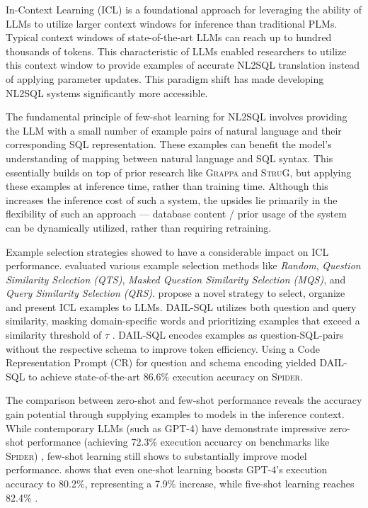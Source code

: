 \documentclass{article}
\begin{document}
In-Context Learning (ICL) is a foundational approach for leveraging the ability of LLMs to utilize larger context windows for
inference than traditional PLMs. Typical context windows of state-of-the-art LLMs can reach up to hundred thousands of tokens.
This characteristic of LLMs enabled researchers to utilize this context window to provide examples of accurate NL2SQL translation
instead of applying parameter updates. This paradigm shift has made developing NL2SQL systems significantly more accessible.

The fundamental principle of few-shot learning for NL2SQL involves providing the LLM with a small number of example pairs
of natural language and their corresponding SQL representation. These examples can benefit the model's understanding of
mapping between natural language and SQL syntax. This essentially builds on top of prior research like \textsc{Grappa}
and \textsc{StruG}, but applying these examples at inference time, rather than training time. Although this increases
the inference cost of such a system, the upsides lie primarily in the flexibility of such an approach — database content
/ prior usage of the system can be dynamically utilized, rather than requiring retraining.

Example selection strategies showed to have a considerable impact on ICL performance. \cite{DAIL-SQL} evaluated
various example selection methods like \textit{Random}, \textit{Question Similarity Selection (QTS)}, 
\textit{Masked Question Similarity Selection (MQS)}, and \textit{Query Similarity Selection (QRS)}. \citeauthor*{DAIL-SQL}
propose a novel strategy to select, organize and present ICL examples to LLMs. DAIL-SQL utilizes both question and
query similarity, masking domain-specific words and prioritizing examples that exceed a similarity threshold of $\tau$
\citep[p.~5]{DAIL-SQL}. DAIL-SQL encodes examples as question-SQL-pairs without the respective schema to improve
token efficiency. Using a Code Representation Prompt (CR) for question and schema encoding yielded DAIL-SQL to achieve
state-of-the-art 86.6\% execution accuracy on \textsc{Spider}.

The comparison between zero-shot and few-shot performance reveals the accuracy gain potential through supplying examples
to models in the inference context. While contemporary LLMs (such as GPT-4) have demonstrate impressive zero-shot performance
(achieving 72.3\% execution accuarcy on benchmarks like \textsc{Spider}) \citep[Table 1, p.~8]{DAIL-SQL}, few-shot learning 
still shows to substantially improve model performance. \cite{DAIL-SQL} shows that even one-shot learning boosts GPT-4's
execution accuracy to 80.2\%, representing a 7.9\% increase, while five-shot learning reaches 82.4\% \citep[Table 2, p.~8]{DAIL-SQL}. 
\end{document}
